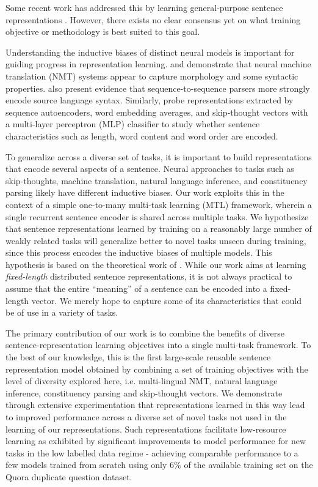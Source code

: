 \documentclass{article} \usepackage{iclr2018_conference,times}
\begin{document}
Some recent work has addressed this by learning general-purpose sentence representations \citep{kiros2015skip,wieting2015towards,hill2016learning,conneau2017supervised,mccann2017learned,jernite2017discourse,nie2017dissent,pagliardini2017unsupervised}. However, there exists no clear consensus yet on what training objective or methodology is best suited to this goal.

Understanding the inductive biases of distinct neural models is important for guiding progress in representation learning. \cite{shi2016does} and \cite{belinkov2017neural} demonstrate that neural machine translation (NMT) systems appear to capture morphology and some syntactic properties. \cite{shi2016does} also present evidence that sequence-to-sequence parsers \citep{vinyals2015grammar} more strongly encode source language syntax. Similarly, \cite{adi2016fine} probe representations extracted by sequence autoencoders, word embedding averages, and skip-thought vectors with a multi-layer perceptron (MLP) classifier to study whether sentence characteristics such as length, word content and word order are encoded.

To generalize across a diverse set of tasks, it is important to build representations that encode several aspects of a sentence. Neural approaches to tasks such as skip-thoughts, machine translation, natural language inference, and constituency parsing likely have different inductive biases. Our work exploits this in the context of a simple one-to-many multi-task learning (MTL) framework, wherein a single recurrent sentence encoder is shared across multiple tasks. We hypothesize that sentence representations learned by training on a reasonably large number of weakly related tasks will generalize better to novel tasks unseen during training, since this process encodes the inductive biases of multiple models. This hypothesis is based on the theoretical work of \cite{baxter2000model}. While our work aims at learning \textit{fixed-length} distributed sentence representations, it is not always practical to assume that the entire ``meaning'' of a sentence can be encoded into a fixed-length vector. We merely hope to capture some of its characteristics that could be of use in a variety of tasks.

The primary contribution of our work is to combine the benefits of diverse sentence-representation learning objectives into a single multi-task framework. To the best of our knowledge, this is the first large-scale reusable sentence representation model obtained by combining a set of training objectives with the level of diversity explored here, i.e. multi-lingual NMT, natural language inference, constituency parsing and skip-thought vectors. We demonstrate through extensive experimentation that representations learned in this way lead to improved performance across a diverse set of novel tasks not used in the learning of our representations. Such representations facilitate low-resource learning as exhibited by significant improvements to model performance for new tasks in the low labelled data regime - achieving comparable performance to a few models trained from scratch using only 6\% of the available training set on the Quora duplicate question dataset.
\end{document}
